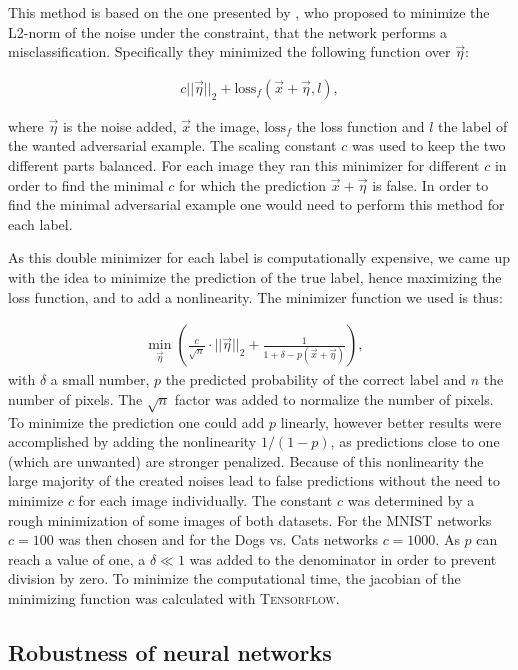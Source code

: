 \documentclass[%
 reprint,
 amsmath,amssymb,
 aps,
]{revtex4-1}
\begin{document}
This method is based on the one presented by \citet{paperMinimize}, who proposed to minimize the L2-norm of the noise under the constraint, that the network performs a misclassification. Specifically they minimized the following function over $\vec{\eta}$:

\begin{align}
c||\vec{\eta}||_2 + \text{loss}_f (\vec{x}+\vec{\eta}, l),
\end{align}

where $\vec{\eta}$ is the noise added, $\vec{x}$ the image,  $\text{loss}_f$ the loss function and $l$ the label of the wanted adversarial example. The scaling constant $c$ was used to keep the two different parts balanced. For each image they ran this minimizer for different $c$ in order to find the minimal $c$ for which the prediction $\vec{x}+\vec{\eta}$ is false. In order to find the minimal adversarial example one would need to perform this method for each label. 

As this double minimizer for each label is computationally expensive, we came up with the idea to minimize the prediction of the true label, hence maximizing the loss function, and to add a nonlinearity. The minimizer function we used is thus:

\begin{align}
\min_{\vec{\eta}} \left( \frac{c}{\sqrt{n}} \cdot ||\vec{\eta}||_2 + \frac{1}{1 + \delta - p(\vec{x}+\vec{\eta})} \right), & \label{eq:minimize}
\end{align}
with $\delta$ a small number, $p$ the predicted probability of the correct label and $n$ the number of pixels. The $\sqrt{n}$ factor was added to normalize the number of pixels. To minimize the prediction one could add $p$ linearly, however better results were accomplished by adding the nonlinearity $1/(1-p)$, as predictions close to one (which are unwanted) are stronger penalized. Because of this nonlinearity the large majority of the created noises lead to false predictions without the need to minimize $c$ for each image individually.  The constant $c$ was determined by a rough minimization of some images of both datasets. 
For the MNIST networks $c = 100$  was then chosen and for the Dogs vs. Cats networks $c = 1000$. 
As $p$ can reach a value of one, a $\delta \ll 1$ was added to the denominator in order to prevent division by zero.
To minimize the computational time, the jacobian of the minimizing function was calculated with  \textsc{Tensorflow}.


\subsection{Robustness of neural networks}
\label{sec:hypothesis}
\end{document}

